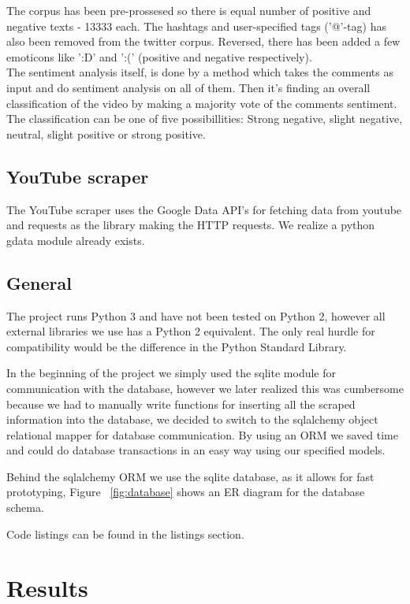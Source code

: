 \documentclass[conference]{IEEEtran}
\begin{document}
The corpus has been pre-prossesed so there is equal number of positive and negative texts - 13333 each. The hashtags and user-specified tags ('@'-tag) has also been removed from the twitter corpus. Reversed, there has been added a few emoticons like ':D' and ':(' (positive and negative respectively).\\

The sentiment analysis itself, is done by a method which takes the comments as input and do sentiment analysis on all of them. Then it's finding an overall classification of the video by making a majority vote of the comments sentiment. The classification can be one of five possibillities: Strong negative, slight negative, neutral, slight positive or strong positive.


\subsection{YouTube scraper}
The YouTube scraper uses the Google Data API's for fetching data from youtube and requests as the library making the HTTP requests. We realize a python gdata module already exists.

\subsection{General}
The project runs Python 3 and have not been tested on Python 2,
however all external libraries we use has a Python 2 equivalent. 
The only real hurdle for compatibility would be the difference in the Python Standard Library.

In the beginning of the project we simply used the sqlite \cite{sqllite} module for communication with the database, however we later realized this was cumbersome because we had to manually write functions for inserting all the scraped information into the database, we decided to switch to the sqlalchemy object relational mapper \cite{sqlalchemy} for database communication. By using an ORM we saved time and could do database transactions in an easy way using our specified models.

Behind the sqlalchemy ORM we use the sqlite database, as it allows for fast prototyping, Figure ~\ref{fig:database} shows an ER diagram for the database schema.

Code listings can be found in the listings section.

\section{Results}
\end{document}
